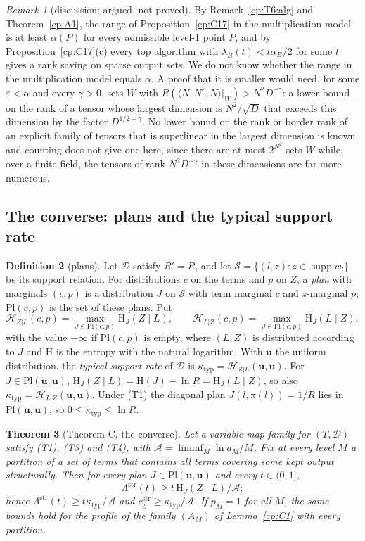 \documentclass[11pt]{article}
\newtheorem{theorem}{Theorem}[section]
\theoremstyle{definition}
\newtheorem{definition}[theorem]{Definition}
\theoremstyle{remark}
\newtheorem{remark}[theorem]{Remark}
\providecommand{\eps}{\varepsilon}
\newcommand{\Ent}{\mathrm{H}}                 %
\DeclareMathOperator{\supp}{supp}
\newcommand{\mat}[3]{\langle #1,#2,#3\rangle} %
\newcommand{\lamB}{\lambda_B}                 %
\newcommand{\alB}{\alpha_B}                   %
\newcommand{\Lam}{\Lambda}                    %
\newcommand{\cg}{c_{\mathrm g}}               %
\newcommand{\Tcond}[1]{\textup{(T#1)}}        %
\newcommand{\Acs}{\mathcal A}                %
\newcommand{\ktyp}{\kappa_{\mathrm{typ}}}    %
\newcommand{\Sr}{\mathcal S}                 %
\newcommand{\Pl}{\mathrm{Pl}}                %
\newcommand{\Hzl}{\mathcal H_{Z|L}}          %
\newcommand{\Hlz}{\mathcal H_{L|Z}}          %
\newcommand{\unif}{\mathbf u}                %
\begin{document}
\begin{remark}[discussion; argued, not proved]\label{cp:C17:disc}
By Remark~\ref{cp:T6:alg} and Theorem~\ref{cp:A1}, the range of Proposition~\ref{cp:C17} in the multiplication model is at least $\alpha(P)$ for every admissible level-1 point $P$, and by Proposition~\ref{cp:C17}(c) every top algorithm with $\lamB(t)<t\alB/2$ for some $t$ gives a rank saving on sparse output sets. We do not know whether the range in the multiplication model equals $\alpha$. A proof that it is smaller would need, for some $\eps<\alpha$ and every $\gamma>0$, sets $W$ with $R(\mat N{N^\eps}N|_W)>N^2D^{-\gamma}$: a lower bound on the rank of a tensor whose largest dimension is $N^2/\sqrt D$ that exceeds this dimension by the factor $D^{1/2-\gamma}$. No lower bound on the rank or border rank of an explicit family of tensors that is superlinear in the largest dimension is known, and counting does not give one here, since there are at most $2^{N^2}$ sets $W$ while, over a finite field, the tensors of rank $N^2D^{-\gamma}$ in these dimensions are far more numerous.
\end{remark}

\subsection{The converse: plans and the typical support rate}\label{cp:sec:tr:C}

\begin{definition}[plans]\label{cp:C6:def}
Let $\mathcal D$ satisfy $R'=R$, and let $\Sr=\{(l,z):z\in\supp w_l\}$ be its support relation. For distributions $c$ on the terms and $p$ on $Z$, a \emph{plan} with marginals $(c,p)$ is a distribution $J$ on $\Sr$ with term marginal $c$ and $z$-marginal $p$; $\Pl(c,p)$ is the set of these plans. Put
\[
\Hzl(c,p)=\max_{J\in\Pl(c,p)}\Ent_J(Z\mid L),\qquad\Hlz(c,p)=\max_{J\in\Pl(c,p)}\Ent_J(L\mid Z),
\]
with the value $-\infty$ if $\Pl(c,p)$ is empty, where $(L,Z)$ is distributed according to $J$ and $\Ent$ is the entropy with the natural logarithm. With $\unif$ the uniform distribution, the \emph{typical support rate} of $\mathcal D$ is $\ktyp=\Hzl(\unif,\unif)$. For $J\in\Pl(\unif,\unif)$, $\Ent_J(Z\mid L)=\Ent(J)-\ln R=\Ent_J(L\mid Z)$, so also $\ktyp=\Hlz(\unif,\unif)$. Under \Tcond1{} the diagonal plan $J(l,\pi(l))=1/R$ lies in $\Pl(\unif,\unif)$, so $0\le\ktyp\le\ln R$.
\end{definition}

\begin{theorem}[Theorem C, the converse]\label{cp:C6}
Let a variable-map family for $(T,\mathcal D)$ satisfy \Tcond1, \Tcond3{} and \Tcond4, with $\Acs=\liminf_M\ln a_M/M$. Fix at every level $M$ a partition of a set of terms that contains all terms covering some kept output structurally. Then for every plan $J\in\Pl(\unif,\unif)$ and every $t\in(0,1]$,
\[
\Lam^{\mathrm{str}}(t)\ge t\,\Ent_J(Z\mid L)/\Acs;
\]
hence $\Lam^{\mathrm{str}}(t)\ge t\ktyp/\Acs$ and $\cg^{\mathrm{str}}\ge\ktyp/\Acs$. If $p_M=1$ for all $M$, the same bounds hold for the profile of the family $(A_M)$ of Lemma~\ref{cp:C1} with every partition.
\end{theorem}
\end{document}
